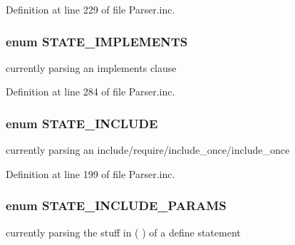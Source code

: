 \-Definition at line 229 of file \-Parser.\-inc.

\hypertarget{_parser_8inc_a609b2135c93fe2c2330db2529833115f}{
\subsubsection[{\-S\-T\-A\-T\-E\-\_\-\-I\-M\-P\-L\-E\-M\-E\-N\-T\-S}]{\setlength{\rightskip}{0pt plus 5cm}enum {\bf \-S\-T\-A\-T\-E\-\_\-\-I\-M\-P\-L\-E\-M\-E\-N\-T\-S}}}\label{_parser_8inc_a609b2135c93fe2c2330db2529833115f}
currently parsing an implements clause 

\-Definition at line 284 of file \-Parser.\-inc.

\hypertarget{_parser_8inc_a242cd4c359096b9f088a5322f6b13694}{
\subsubsection[{\-S\-T\-A\-T\-E\-\_\-\-I\-N\-C\-L\-U\-D\-E}]{\setlength{\rightskip}{0pt plus 5cm}enum {\bf \-S\-T\-A\-T\-E\-\_\-\-I\-N\-C\-L\-U\-D\-E}}}\label{_parser_8inc_a242cd4c359096b9f088a5322f6b13694}
currently parsing an include/require/include\-\_\-once/include\-\_\-once 

\-Definition at line 199 of file \-Parser.\-inc.

\hypertarget{_parser_8inc_afd991e53cfd8f9f331df855c43ebf316}{
\subsubsection[{\-S\-T\-A\-T\-E\-\_\-\-I\-N\-C\-L\-U\-D\-E\-\_\-\-P\-A\-R\-A\-M\-S}]{\setlength{\rightskip}{0pt plus 5cm}enum {\bf \-S\-T\-A\-T\-E\-\_\-\-I\-N\-C\-L\-U\-D\-E\-\_\-\-P\-A\-R\-A\-M\-S}}}\label{_parser_8inc_afd991e53cfd8f9f331df855c43ebf316}
currently parsing the stuff in ( ) of a define statement 

